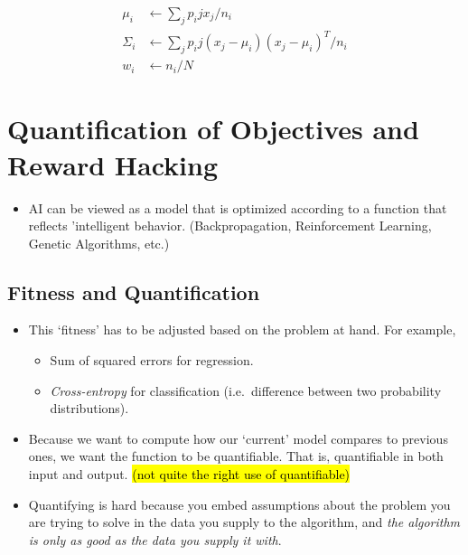 \documentclass[
]{book}
\providecommand{\tightlist}{%
  \setlength{\itemsep}{0pt}\setlength{\parskip}{0pt}}
\begin{document}
\[
\begin{split}
   \mu_i &\leftarrow \sum_j p_ij x_j / n_i \\
   \Sigma_i &\leftarrow \sum_j p_ij (x_j - \mu_i)(x_j - \mu_i)^T / n_i \\
   w_i &\leftarrow n_i / N
\end{split}
\]

\hypertarget{quantification-of-objectives-and-reward-hacking}{%
\chapter{Quantification of Objectives and Reward
Hacking}\label{quantification-of-objectives-and-reward-hacking}}

\begin{itemize}
\tightlist
\item
  AI can be viewed as a model that is optimized according to a function
  that reflects 'intelligent behavior. (Backpropagation, Reinforcement
  Learning, Genetic Algorithms, etc.)
\end{itemize}

\hypertarget{fitness-and-quantification}{%
\section{Fitness and Quantification}\label{fitness-and-quantification}}

\begin{itemize}
\item
  This `fitness' has to be adjusted based on the problem at hand. For
  example,

  \begin{itemize}
  \tightlist
  \item
    Sum of squared errors for regression.
  \item
    \emph{Cross-entropy} for classification (i.e.~difference between two
    probability distributions).
  \end{itemize}
\item
  Because we want to compute how our `current' model compares to
  previous ones, we want the function to be quantifiable. That is,
  quantifiable in both input and output. \hl{(not quite the right use of
  quantifiable)}
\item
  Quantifying is hard because you embed assumptions about the problem
  you are trying to solve in the data you supply to the algorithm, and
  \emph{the algorithm is only as good as the data you supply it with}.
\end{itemize}
\end{document}
